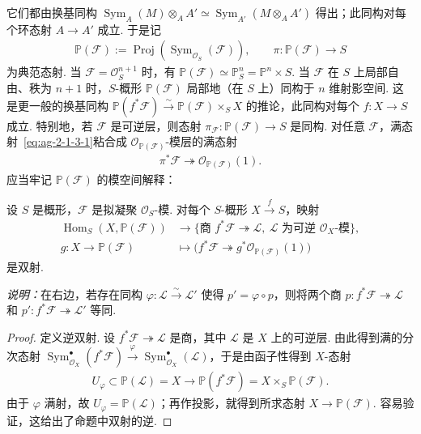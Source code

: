 \begin{numpara}[整体化]
\begin{itemize}
\end{itemize}
它们都由换基同构 $\operatorname{Sym}_A(M)\otimes_AA'\simeq\operatorname{Sym}_{A'}(M\otimes_AA')$ 得出；此同构对每个环态射 $A\longrightarrow A'$ 成立.
于是记
\begin{align*}
\mathbb P(\mathcal F):=\operatorname{Proj}(\operatorname{Sym}_{\mathcal O_S}(\mathcal F)),\qquad
\pi:\mathbb P(\mathcal F)\longrightarrow S
\end{align*}
为典范态射. 当 $\mathcal F=\mathcal O_S^{n+1}$ 时，有 $\mathbb P(\mathcal F)\simeq\mathbb P_S^n=\mathbb P^n\times S$. 当 $\mathcal F$ 在 $S$ 上局部自由、秩为 $n+1$ 时，$S$-概形 $\mathbb P(\mathcal F)$ 局部地（在 $S$ 上）同构于 $n$ 维射影空间. 这是更一般的换基同构 $\mathbb P(f^*\mathcal F)\xrightarrow\sim\mathbb P(\mathcal F)\times_SX$ 的推论，此同构对每个 $f:X\longrightarrow S$ 成立. 特别地，若 $\mathcal F$ 是可逆层，则态射 $\pi_{\mathcal F}:\mathbb P(\mathcal F)\longrightarrow S$ 是同构. 对任意 $\mathcal F$，满态射~\eqref{eq:ag-2-1-3-1}粘合成 $\mathcal O_{\mathbb P(\mathcal F)}$-模层的满态射
\begin{align}
\pi^*\mathcal F\twoheadrightarrow\mathcal O_{\mathbb P(\mathcal F)}(1).\tag{2.1.4.1}\label{eq:ag-2-1-4-1}
\end{align}
应当牢记 $\mathbb P(\mathcal F)$ 的模空间解释：
\end{numpara}
\begin{proposition}\label{item:ag-2-1-5}
设 $S$ 是概形，$\mathcal F$ 是拟凝聚 $\mathcal O_S$-模. 对每个 $S$-概形 $X\xrightarrow f S$，映射
\begin{align*}
\operatorname{Hom}_S(X,\mathbb P(\mathcal F))
&\longrightarrow\{\text{商 }f^*\mathcal F\twoheadrightarrow\mathcal L,\ \mathcal L\text{ 为可逆 }\mathcal O_X\text{-模}\},\\
g:X\longrightarrow\mathbb P(\mathcal F)
&\longmapsto\bigl(f^*\mathcal F\twoheadrightarrow g^*\mathcal O_{\mathbb P(\mathcal F)}(1)\bigr)
\end{align*}
是双射.
\end{proposition}
\emph{说明：}在右边，若存在同构 $\varphi:\mathcal L\xrightarrow\sim\mathcal L'$ 使得 $p'=\varphi\circ p$，则将两个商 $p:f^*\mathcal F\twoheadrightarrow\mathcal L$ 和 $p':f^*\mathcal F\twoheadrightarrow\mathcal L'$ 等同.
\begin{proof}
定义逆双射. 设 $f^*\mathcal F\twoheadrightarrow\mathcal L$ 是商，其中 $\mathcal L$ 是 $X$ 上的可逆层. 由此得到满的分次态射 $\operatorname{Sym}_{\mathcal O_X}^\bullet(f^*\mathcal F)\xrightarrow\varphi\operatorname{Sym}_{\mathcal O_X}^\bullet(\mathcal L)$，于是由函子性得到 $X$-态射
\begin{align*}
U_\varphi\subset\mathbb P(\mathcal L)=X\longrightarrow\mathbb P(f^*\mathcal F)=X\times_S\mathbb P(\mathcal F).
\end{align*}
由于 $\varphi$ 满射，故 $U_\varphi=\mathbb P(\mathcal L)$；再作投影，就得到所求态射 $X\longrightarrow\mathbb P(\mathcal F)$. 容易验证，这给出了命题中双射的逆.
\end{proof}
